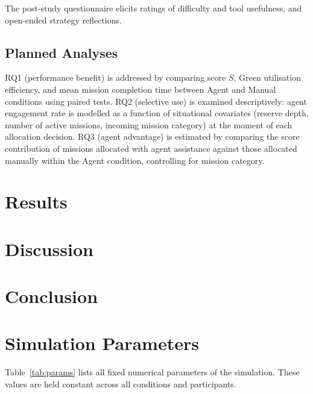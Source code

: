 \documentclass[10pt]{article}
\theoremstyle{definition}
\begin{document}
The post-study questionnaire elicits ratings of difficulty and tool usefulness, and open-ended strategy reflections.

\subsection{Planned Analyses}

RQ1 (performance benefit) is addressed by comparing score $S$, Green utilisation efficiency, and mean mission completion time between Agent and Manual conditions using paired tests. RQ2 (selective use) is examined descriptively: agent engagement rate is modelled as a function of situational covariates (reserve depth, number of active missions, incoming mission category) at the moment of each allocation decision. RQ3 (agent advantage) is estimated by comparing the score contribution of missions allocated with agent assistance against those allocated manually within the Agent condition, controlling for mission category.

\section{Results}\label{sec:results}


\section{Discussion}\label{sec:discussion}

\section{Conclusion}\label{sec:conclusion}





\appendix
\section{Simulation Parameters}\label{app:params}

Table~\ref{tab:params} lists all fixed numerical parameters of the simulation. These values are held constant across all conditions and participants.
\end{document}
